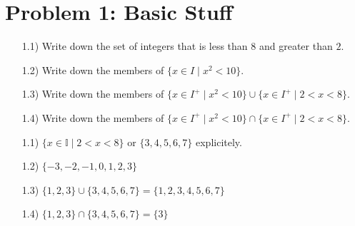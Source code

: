 \newcommand{\hmwkTitle}{Homework 0}
\newcommand{\hmwkDueDate}{Tuesday, January 20, 2026}
\newcommand{\hmwkHeaderTitle}{ICCS206 Discrete Mathematic: Homework 0}


\section*{Problem 1: Basic Stuff}
\begin{enumerate}
    \item[1.1)] Write down the set of integers that is less than $8$ and greater than $2$.
    \item[1.2)] Write down the members of $\{x \in I \mid x^2 < 10\}$.
    \item[1.3)] Write down the members of $\{x \in I^+ \mid x^2 < 10\} \cup \{x \in I^+ \mid 2 < x < 8\}$.
    \item[1.4)] Write down the members of $\{x \in I^+ \mid x^2 < 10\} \cap \{x \in I^+ \mid 2 < x < 8\}$.
\end{enumerate}

\medskip
\solution

\begin{enumerate}
    \item[1.1)] $\{x \in \mathbb{I} \mid 2 < x < 8\}$ or $\{3, 4, 5, 6, 7\}$ explicitely.
    \item[1.2)] $\{-3, -2, -1, 0, 1, 2, 3\}$
    \item[1.3)] $\{1, 2, 3\} \cup \{3, 4, 5, 6, 7\} = \boxed{\{1, 2, 3, 4, 5, 6, 7\}}$ 
    \item[1.4)] $\{1, 2, 3\} \cap \{3, 4, 5, 6, 7\} = \boxed{\{3\}}$
\end{enumerate}


\vspace{1em}
\hrulefill

